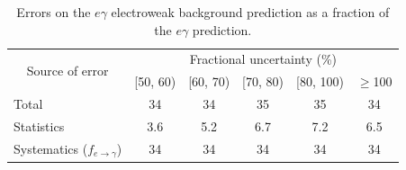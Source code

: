 \documentclass[dissertation.tex]{subfiles}
\begin{document}
\begin{table}[hcbp]
\caption{Errors on the $e\gamma$ electroweak background prediction as a fraction of the $e\gamma$ prediction.}
\centering
\begin{tabular}{|p{5cm}|c|c|c|c|c|}
\hline
\multicolumn{1}{|c|}{\multirow{2}{*}{Source of error}} & \multicolumn{5}{c|}{Fractional uncertainty (\%)} \\
\cline{2-6}
& [50, 60) & [60, 70) & [70, 80) & [80, 100) & $\geq$100 \\
\hline
\hline
Total & 34 & 34 & 35 & 35 & 34 \\
\hline
\hspace{0.5cm}Statistics & 3.6 & 5.2 & 6.7 & 7.2 & 6.5 \\
\hline
\hspace{0.5cm}Systematics ($f_{e\rightarrow\gamma}$) & 34 & 34 & 34 & 34 & 34 \\
\hline
\end{tabular}
\label{tab:eg_background_prediction_errors}
\end{table}
\end{document}
